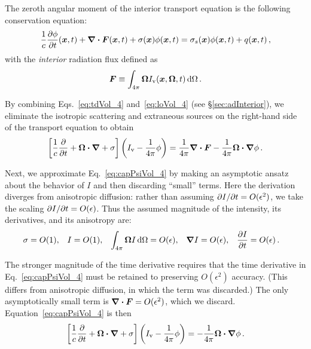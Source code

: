 The zeroth angular moment of the interior transport equation is the following
conservation equation:
\begin{equation} \label{eq:loVol_4}
\frac{1}{c} \frac{\partial \phi}{\partial t} (\bm{x}, t)
  + \bm{\nabla} \bm{\cdot}\bm{F}(\bm{x}, t)
  + \sigma(\bm{x}) \phi(\bm{x}, t)
 = \sigma_s(\bm{x}) \phi(\bm{x},t) + q(\bm{x},t)\,,
\end{equation}
with the \emph{interior} radiation flux defined as
\begin{equation}\label{eq:tdF_4}
  \bm{F} \equiv \int_{4\pi} \bm{\Omega} I_\mathrm{v}(\bm{x}, \bm{\Omega},t) \mathop{}\!\mathrm{d}
  \Omega\,.
\end{equation}

By combining Eqs.~\eqref{eq:tdVol_4} and~\eqref{eq:loVol_4} (see
\S\ref{sec:adInterior}), we eliminate the isotropic scattering and extraneous
sources on
the right-hand side of the transport equation to obtain
\begin{equation}\label{eq:capPsiVol_4}
  \left[ \frac{1}{c}\frac{\partial }{\partial t}
  + \bm{\Omega}\bm{\cdot} \bm{\nabla}
  + \sigma \right]
   \left( I_\mathrm{v}
  - \frac{1}{4\pi} \phi \right)
  = \frac{1}{4\pi} \bm{\nabla} \bm{\cdot}\bm{F} -
  \frac{1}{4\pi} \bm{\Omega}\bm{\cdot} \bm{\nabla} \phi\,.
\end{equation}

Next, we approximate Eq.~\eqref{eq:capPsiVol_4} by making an asymptotic ansatz
about the behavior of $I$ and then discarding ``small'' terms. Here the
derivation diverges from anisotropic diffusion: rather than assuming
${\partial I}/{\partial t} = O(\epsilon^2)$, we take the scaling ${\partial I}/{\partial t} =
O(\epsilon)$. Thus the assumed magnitude of the intensity, its derivatives, and
its anisotropy are:
\begin{align} \label{eq:ap1ansatz}
  \sigma &= O(1), &
  I &= O(1), &
  \int_{4\pi} \bm{\Omega} I \mathop{}\!\mathrm{d}\Omega &= O(\epsilon), &
  \bm{\nabla} I &= O(\epsilon), &
  \frac{\partial I}{\partial t} &= O(\epsilon) \,.
\end{align}

The stronger magnitude of the time derivative requires that the time derivative
in Eq.~\eqref{eq:capPsiVol_4} must be retained to preserving $O(\epsilon^2)$
accuracy. (This differs from anisotropic diffusion, in which the term was
discarded.) The only asymptotically
small term is $\bm{\nabla} \bm{\cdot}\bm{F} = O(\epsilon^2)$, which we discard.
Equation~\eqref{eq:capPsiVol_4} is then
\begin{equation*}
  \left[ \frac{1}{c}\frac{\partial }{\partial t}
  + \bm{\Omega}\bm{\cdot} \bm{\nabla}
  + \sigma \right]
   \left( I_\mathrm{v} - \frac{1}{4\pi} \phi \right)
  = - \frac{1}{4\pi} \bm{\Omega}\bm{\cdot} \bm{\nabla} \phi\,.
\end{equation*}

